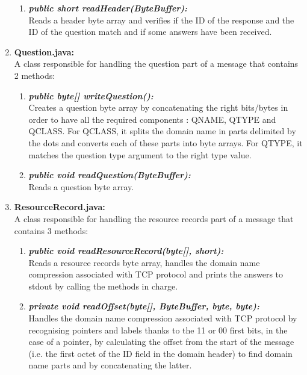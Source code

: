 \documentclass[a4paper, 11pt]{article}
\begin{document}
\begin{enumerate}
\begin{enumerate}
            \item \textbf{\textit{public short readHeader(ByteBuffer):}}\\ Reads a header byte array and verifies if the ID of the response and the ID of the question match and if some answers have been received.
        \end{enumerate}

    \item \textbf{Question.java:}\\ A class responsible for handling the question part of a message that contains 2 methods:
        \begin{enumerate}
            \item \textbf{\textit{public byte[] writeQuestion():}}\\ Creates a question byte array by concatenating the right bits/bytes in order to have all the required components : QNAME, QTYPE and QCLASS. For QCLASS, it splits the domain name in parts delimited by the dots and converts each of these parts into byte arrays. For QTYPE, it matches the question type argument to the right type value.

            \item \textbf{\textit{public void readQuestion(ByteBuffer):}}\\ Reads a question byte array.
        \end{enumerate}

    \item \textbf{ResourceRecord.java:}\\ A class responsible for handling the resource records part of a message that contains 3 methods:
        \begin{enumerate}
            \item \textbf{\textit{public void readResourceRecord(byte[], short):}}\\ Reads a resource records byte array, handles the domain name compression associated with TCP protocol and prints the answers to stdout by calling the methods in charge.
            
            \item \textbf{\textit{private void readOffset(byte[], ByteBuffer, byte, byte):}}\\ Handles the domain name compression associated with TCP protocol by recognising pointers and labels thanks to the 11 or 00 first bits, in the case of a pointer, by calculating the offset from the start of the message (i.e. the first octet of the ID field in the domain header) to find domain name parts and by concatenating the latter.
            

\end{enumerate}
\end{enumerate}
\end{document}
